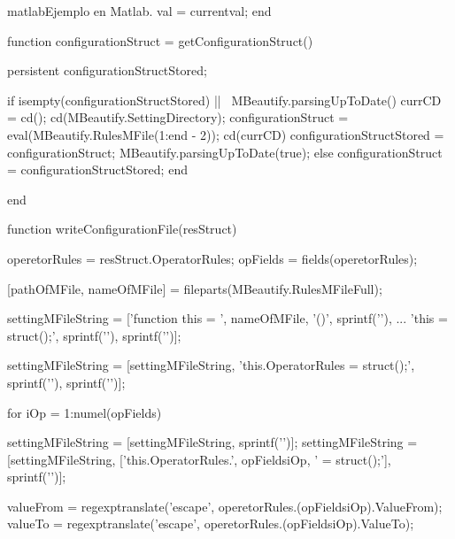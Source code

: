 \begin{sourcecode}{matlab}{Ejemplo en Matlab.}
            val = currentval;
        end
        
        function configurationStruct = getConfigurationStruct()
            
            persistent configurationStructStored;
            
            if isempty(configurationStructStored) || ~MBeautify.parsingUpToDate()
                currCD = cd();
                cd(MBeautify.SettingDirectory);
                configurationStruct = eval(MBeautify.RulesMFile(1:end - 2));
                cd(currCD)
                configurationStructStored = configurationStruct;
                MBeautify.parsingUpToDate(true);
            else
                configurationStruct = configurationStructStored;
            end
            
        end
        
        
        function writeConfigurationFile(resStruct)
            
            operetorRules = resStruct.OperatorRules;
            opFields = fields(operetorRules);
            
            [pathOfMFile, nameOfMFile] = fileparts(MBeautify.RulesMFileFull); %
            
            settingMFileString = ['function this = ', nameOfMFile, '()', sprintf('\n'), ...
                'this = struct();', sprintf('\n'), sprintf('\n')];
            
            settingMFileString = [settingMFileString, 'this.OperatorRules = struct();', sprintf('\n'), sprintf('\n')];
            
            for iOp = 1:numel(opFields)
                
                settingMFileString = [settingMFileString, sprintf('\n')];
                settingMFileString = [settingMFileString, ['this.OperatorRules.', opFields{iOp}, ' = struct();'], sprintf('\n')];
                
                valueFrom = regexptranslate('escape', operetorRules.(opFields{iOp}).ValueFrom);
                valueTo = regexptranslate('escape', operetorRules.(opFields{iOp}).ValueTo);
                

\end{sourcecode}
